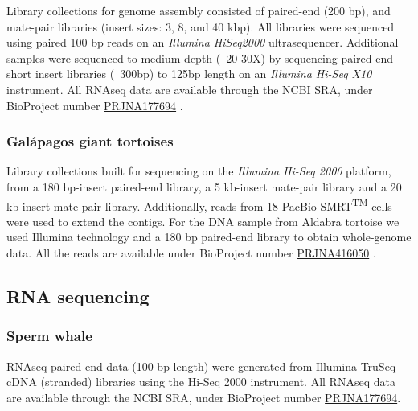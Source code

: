 Library collections for genome assembly consisted of paired-end (200 bp), and mate-pair libraries (insert sizes: 3, 8, and 40 kbp). All libraries were sequenced using paired 100 bp reads on an \textsl{Illumina HiSeq2000} ultrasequencer.
Additional samples were sequenced to medium depth (~20-30X) by sequencing paired-end short insert libraries (~300bp) to 125bp length on an \textsl{Illumina Hi-Seq X10} instrument.
All RNAseq data are available through the NCBI SRA, under BioProject number \href{https://www.ncbi.nlm.nih.gov/bioproject/177694}{PRJNA177694}%
.

\subsubsection*{Gal\'{a}pagos giant tortoises}

Library collections built for sequencing on the \textsl{Illumina Hi-Seq 2000} platform, from a 180 bp-insert paired-end library, a 5 kb-insert mate-pair library and a 20 kb-insert mate-pair library.
Additionally, reads from 18 PacBio SMRT\textsuperscript{TM} cells were used to extend the contigs.
For the DNA sample from Aldabra tortoise we used Illumina technology and a 180 bp paired-end library to obtain whole-genome data.
All the reads are available under BioProject number \href{https://www.ncbi.nlm.nih.gov/bioproject/416050}{PRJNA416050}%
.

\subsection{RNA sequencing} \label{ss_matmet_molecular_rna_sequencing}

\subsubsection*{Sperm whale}

RNAseq paired-end data (100 bp length) were generated from Illumina TruSeq cDNA (stranded) libraries using the Hi-Seq 2000 instrument. %
All RNAseq data are available through the NCBI SRA, under BioProject number \href{https://www.ncbi.nlm.nih.gov/bioproject/PRJNA177694}{PRJNA177694}.

